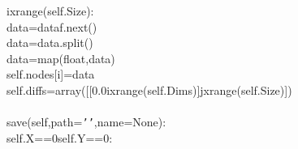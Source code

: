 {{\begin{tabbing}
\hspace{6pt}i\hspace{6pt}xrange(self.Size):\\
\hspace{72pt}data\hspace{6pt}=\hspace{6pt}dataf.next()\\
\hspace{72pt}data\hspace{6pt}=\hspace{6pt}data.split()\\
\hspace{72pt}data\hspace{6pt}=\hspace{6pt}map(float,data)\\
\hspace{72pt}self.nodes{[}i{]}\hspace{6pt}=\hspace{6pt}data\\
\hspace{48pt}self.diffs\hspace{6pt}=\hspace{6pt}array({[}{[}0.0\hspace{6pt}i\hspace{6pt}xrange(self.Dims){]}\hspace{6pt}j\hspace{6pt}xrange(self.Size){]})\\
\\
\hspace{6pt}save(self,path={\texttt{{'}{'}}},name=None):\\
\hspace{6pt}self.X\hspace{6pt}==\hspace{6pt}0\hspace{6pt}self.Y\hspace{6pt}==\hspace{6pt}0:\\

\end{tabbing}}}
